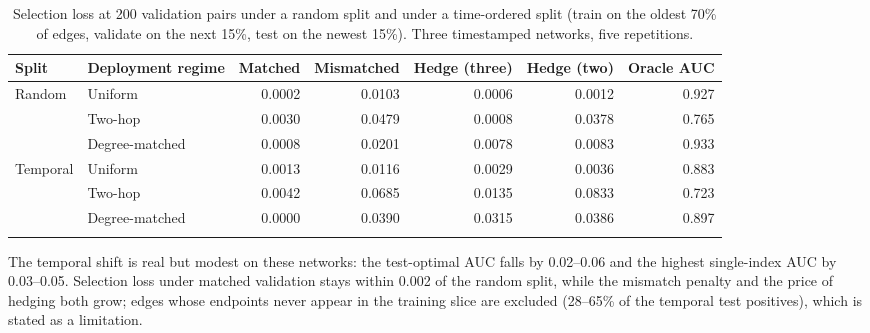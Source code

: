 \begin{table}[htbp]
\centering
\scriptsize
\caption{Selection loss at 200 validation pairs under a random split and under a time-ordered split (train on the oldest 70\% of edges, validate on the next 15\%, test on the newest 15\%). Three timestamped networks, five repetitions.}
\label{tab:temporal}
\begin{tabular}{l l r r r r r}
\toprule
Split & Deployment regime & Matched & Mismatched & Hedge (three) & Hedge (two) & Oracle AUC \\
\midrule
Random & Uniform & 0.0002 & 0.0103 & 0.0006 & 0.0012 & 0.927 \\
 & Two-hop & 0.0030 & 0.0479 & 0.0008 & 0.0378 & 0.765 \\
 & Degree-matched & 0.0008 & 0.0201 & 0.0078 & 0.0083 & 0.933 \\
\addlinespace[2pt]
Temporal & Uniform & 0.0013 & 0.0116 & 0.0029 & 0.0036 & 0.883 \\
 & Two-hop & 0.0042 & 0.0685 & 0.0135 & 0.0833 & 0.723 \\
 & Degree-matched & 0.0000 & 0.0390 & 0.0315 & 0.0386 & 0.897 \\
\addlinespace[2pt]
\bottomrule
\end{tabular}
\par\vspace{2pt}\begin{minipage}{\linewidth}\footnotesize The temporal shift is real but modest on these networks: the test-optimal AUC falls by 0.02--0.06 and the highest single-index AUC by 0.03--0.05. Selection loss under matched validation stays within 0.002 of the random split, while the mismatch penalty and the price of hedging both grow; edges whose endpoints never appear in the training slice are excluded (28--65\% of the temporal test positives), which is stated as a limitation.\end{minipage}
\end{table}
